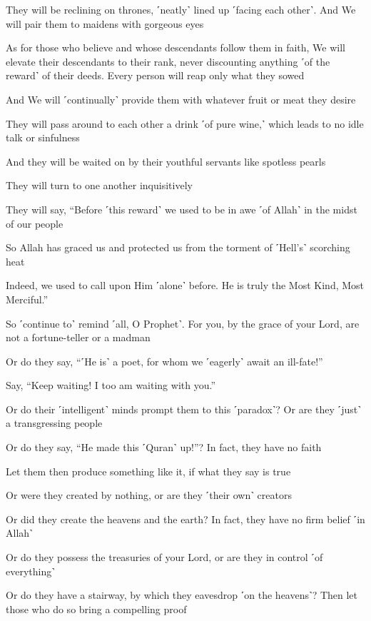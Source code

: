 They will be reclining on thrones, ˹neatly˺ lined up ˹facing each other˺. And We will pair them to maidens with gorgeous eyes

As for those who believe and whose descendants follow them in faith, We will elevate their descendants to their rank, never discounting anything ˹of the reward˺ of their deeds. Every person will reap only what they sowed

And We will ˹continually˺ provide them with whatever fruit or meat they desire

They will pass around to each other a drink ˹of pure wine,˺ which leads to no idle talk or sinfulness

And they will be waited on by their youthful servants like spotless pearls

They will turn to one another inquisitively

They will say, “Before ˹this reward˺ we used to be in awe ˹of Allah˺ in the midst of our people

So Allah has graced us and protected us from the torment of ˹Hell’s˺ scorching heat

Indeed, we used to call upon Him ˹alone˺ before. He is truly the Most Kind, Most Merciful.”

So ˹continue to˺ remind ˹all, O Prophet˺. For you, by the grace of your Lord, are not a fortune-teller or a madman

Or do they say, “˹He is˺ a poet, for whom we ˹eagerly˺ await an ill-fate!”

Say, “Keep waiting! I too am waiting with you.”

Or do their ˹intelligent˺ minds prompt them to this ˹paradox˺? Or are they ˹just˺ a transgressing people

Or do they say, “He made this ˹Quran˺ up!”? In fact, they have no faith

Let them then produce something like it, if what they say is true

Or were they created by nothing, or are they ˹their own˺ creators

Or did they create the heavens and the earth? In fact, they have no firm belief ˹in Allah˺

Or do they possess the treasuries of your Lord, or are they in control ˹of everything˺

Or do they have a stairway, by which they eavesdrop ˹on the heavens˺? Then let those who do so bring a compelling proof

